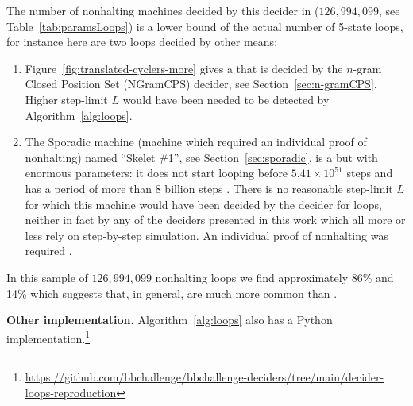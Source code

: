 The number of nonhalting machines decided by this decider in \CoqBB (\ie $126{,}994{,}099$, see Table~\ref{tab:paramsLoops}) is a lower bound of the actual number of 5-state loops, for instance here are two loops decided by other means:

\begin{enumerate}
  \item Figure~\ref{fig:translated-cyclers-more} gives a \TC that is decided by the $n$-gram Closed Position Set (NGramCPS) decider, see Section~\ref{sec:n-gramCPS}. Higher step-limit $L$ would have been needed to be detected by Algorithm~\ref{alg:loops}.
  \item The Sporadic machine (\ie machine which required an individual proof of nonhalting) named ``Skelet \#1'', see Section~\ref{sec:sporadic}, is a \TC but with enormous parameters: it does not start looping before $5.41 \times 10^{51}$ steps and has a period of more than 8 billion steps \cite{ShawnSkelet1}. There is no reasonable step-limit $L$ for which this machine would have been decided by the decider for loops, neither in fact by any of the deciders presented in this work which all more or less rely on step-by-step simulation. An individual proof of nonhalting was required \cite{busycoq}.
\end{enumerate}

In this sample of $126{,}994{,}099$ nonhalting loops we find approximately 86\% \TCs and 14\% \cyclers which suggests that, in general, \TCs are much more common than \cyclers.

\textbf{Other implementation.} Algorithm~\ref{alg:loops} also has a Python implementation.\footnote{\url{https://github.com/bbchallenge/bbchallenge-deciders/tree/main/decider-loops-reproduction}}